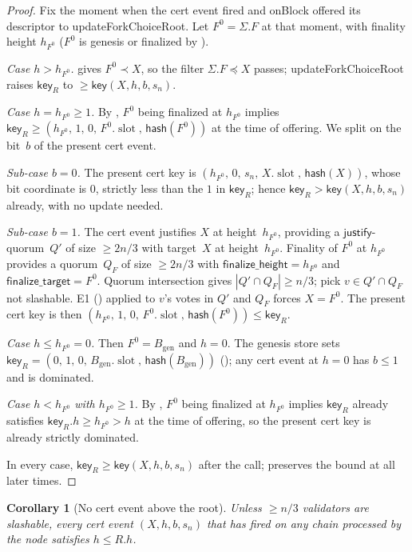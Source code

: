 \documentclass{article}
\newcommand{\genesis}{\ensuremath{B_{\mathrm{gen}}}}
\newcommand{\slot}[0]{\ensuremath{\operatorname{\mathrm{slot}}}}
\newcommand{\just}{\ensuremath{\mathsf{justify}}\xspace}
\newcommand{\finalizeHeight}{\mathsf{finalize\_height}}
\newcommand{\finalizeTarget}{\mathsf{finalize\_target}}
\newcommand{\hash}{\mathsf{hash}}
\newcommand{\key}{\mathsf{key}}
\newcommand{\onBlock}{\textsf{onBlock}\xspace}
\newcommand{\updateForkChoiceRoot}{\textsf{updateForkChoiceRoot}\xspace}
\theoremstyle{plain}
\newtheorem{corollary}{Corollary}
\theoremstyle{definition}
\theoremstyle{remark}
\begin{document}
\begin{proof}
Fix the moment when the cert event fired and \onBlock offered its descriptor to \updateForkChoiceRoot. Let $F^0 = \Sigma.F$ at that moment, with finality height $h_{F^0}$ ($F^0$ is genesis or finalized by ).

\emph{Case $h > h_{F^0}$.}  gives $F^0 \prec X$, so the filter $\Sigma.F \preceq X$ passes; \updateForkChoiceRoot raises $\key_R$ to $\geq \key(X, h, b, s_n)$.

\emph{Case $h = h_{F^0} \geq 1$.}
By , $F^0$ being finalized at $h_{F^0}$ implies $\key_R \geq (h_{F^0},\, 1,\, 0,\, F^0.\slot,\, \hash(F^0))$ at the time of offering. We split on the bit~$b$ of the present cert event.

\emph{Sub-case $b = 0$.} The present cert key is $(h_{F^0},\, 0,\, s_n,\, X.\slot,\, \hash(X))$, whose bit coordinate is $0$, strictly less than the $1$ in $\key_R$; hence $\key_R > \key(X, h, b, s_n)$ already, with no update needed.

\emph{Sub-case $b = 1$.} The cert event justifies $X$ at height~$h_{F^0}$, providing a \just-quorum~$Q'$ of size $\geq 2n/3$ with target~$X$ at height~$h_{F^0}$. Finality of $F^0$ at $h_{F^0}$ provides a quorum~$Q_F$ of size $\geq 2n/3$ with $\finalizeHeight = h_{F^0}$ and $\finalizeTarget = F^0$. Quorum intersection gives $|Q' \cap Q_F| \geq n/3$; pick $v \in Q' \cap Q_F$ not slashable. E1 () applied to $v$'s votes in $Q'$ and $Q_F$ forces $X = F^0$. The present cert key is then $(h_{F^0},\, 1,\, 0,\, F^0.\slot,\, \hash(F^0)) \leq \key_R$.

\emph{Case $h \leq h_{F^0} = 0$.} Then $F^0 = \genesis$ and $h = 0$. The genesis store sets $\key_R = (0,\, 1,\, 0,\, \genesis.\slot,\, \hash(\genesis))$ (); any cert event at $h = 0$ has $b \leq 1$ and is dominated.

\emph{Case $h < h_{F^0}$ with $h_{F^0} \geq 1$.} By , $F^0$ being finalized at $h_{F^0}$ implies $\key_R$ already satisfies $\key_R.h \geq h_{F^0} > h$ at the time of offering, so the present cert key is already strictly dominated.

In every case, $\key_R \geq \key(X, h, b, s_n)$ after the call;  preserves the bound at all later times.
\end{proof}

\begin{corollary}[No cert event above the root]\label{rev:cor:no-high-cn}
Unless $\geq n/3$ validators are slashable, every cert event $(X, h, b, s_n)$ that has fired on any chain processed by the node satisfies $h \leq R.h$.
\end{corollary}
\end{document}
